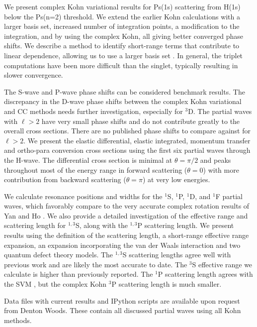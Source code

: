 \documentclass[reprint,showpacs,preprintnumbers,amsmath,amssymb,pra,aps]{revtex4-1}
\begin{document}
We present complex Kohn variational results for Ps(1s) scattering from H(1s) below the Ps(n=2) threshold. We extend the earlier Kohn calculations \cite{VanReeth2003,VanReeth2004} with a larger basis set, increased number of integration points, a modification to the integration, and by using the complex Kohn, all giving better converged phase shifts. We describe a method to identify short-range terms that contribute to linear dependence, allowing us to use a larger basis set \cite{Todd2007}. In general, the triplet computations have been more difficult than the singlet, typically resulting in slower convergence.

The S-wave and P-wave phase shifts can be considered benchmark results. The discrepancy in the D-wave phase shifts between the complex Kohn variational and CC methods needs further investigation, especially for $^3$D. The partial waves with $\ell > 2$ have very small phase shifts and do not contribute greatly to the overall cross sections. There are no published phase shifts to compare against for $\ell > 2$. We present the elastic differential, elastic integrated, momentum transfer and ortho-para conversion cross sections using the first six partial waves through the H-wave. The differential cross section is minimal at $\theta = \pi/2$ and peaks throughout most of the energy range in forward scattering ($\theta = 0$) with more contribution from backward scattering ($\theta = \pi$) at very low energies.

We calculate resonance positions and widths for the $^1$S, $^1$P, $^1$D, and $^1$F partial waves, which favorably compare to the very accurate complex rotation results of Yan and Ho \cite{Yan1999,Yan1998a,Ho1998,Ho2000}. We also provide a detailed investigation of the effective range and scattering length for $^{1,3}$S, along with the $^{1,3}$P scattering length. We present results using the definition of the scattering length, a short-range effective range expansion, an expansion incorporating the van der Waals interaction and two quantum defect theory models. The $^{1,3}$S scattering lengths agree well with previous work and are likely the most accurate to date. The $^3$S effective range we calculate is higher than previously reported. The $^1$P scattering length agrees with the SVM \cite{Ivanov2002}, but the complex Kohn $^3$P scattering length is much smaller.

Data files with current results and IPython scripts are available upon request from Denton Woods. These contain all discussed partial waves using all Kohn methods.
\end{document}
